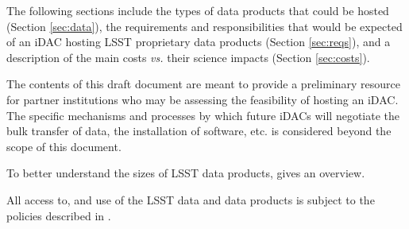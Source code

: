 The following sections include the types of data products that could be hosted (Section \ref{sec:data}), the requirements and responsibilities that would be expected of an iDAC hosting LSST proprietary data products (Section \ref{sec:reqs}), and a description of the main costs {\it vs.} their science impacts (Section \ref{sec:costs}).

The contents of this draft document are meant to provide a preliminary resource for partner institutions who may be assessing the feasibility of hosting an iDAC. The specific mechanisms and processes by which future iDACs will negotiate the bulk transfer of data, the installation of software, etc. is considered beyond the scope of this document.

To better understand the sizes of LSST data products,  gives an overview.



All access to, and use of the LSST data and data products is subject to the policies described in .
